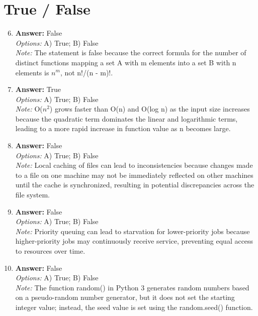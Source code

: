 \documentclass[12pt]{article}
\begin{document}
\section*{True / False}
\begin{enumerate}[label=\arabic*.]
\setcounter{enumi}{5}
\item \textbf{Answer:} False
\\ \textit{Options:} A) True; B) False
\\ \textit{Note:} The statement is false because the correct formula for the number of distinct functions mapping a set A with m elements into a set B with n elements is $n^m$, not n!/(n - m)!.
\item \textbf{Answer:} True
\\ \textit{Options:} A) True; B) False
\\ \textit{Note:} O($n^2$) grows faster than O(n) and O(log n) as the input size increases because the quadratic term dominates the linear and logarithmic terms, leading to a more rapid increase in function value as n becomes large.
\item \textbf{Answer:} False
\\ \textit{Options:} A) True; B) False
\\ \textit{Note:} Local caching of files can lead to inconsistencies because changes made to a file on one machine may not be immediately reflected on other machines until the cache is synchronized, resulting in potential discrepancies across the file system.
\item \textbf{Answer:} False
\\ \textit{Options:} A) True; B) False
\\ \textit{Note:} Priority queuing can lead to starvation for lower-priority jobs because higher-priority jobs may continuously receive service, preventing equal access to resources over time.
\item \textbf{Answer:} False
\\ \textit{Options:} A) True; B) False
\\ \textit{Note:} The function random() in Python 3 generates random numbers based on a pseudo-random number generator, but it does not set the starting integer value; instead, the seed value is set using the random.seed() function.
\end{enumerate}
\end{document}
